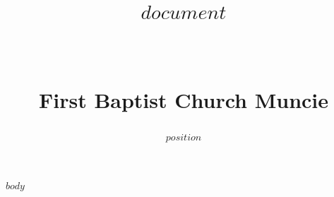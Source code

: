 \documentclass[paper=letter, fontsize=11pt]{scrartcl}	%
\title{ \vspace{-1in} 	\usefont{OT1}{bch}{b}{n}
		\huge \strut $document$ \strut \\
		\Large \bfseries \strut First Baptist Church Muncie \strut
}
\author{ 									\usefont{OT1}{bch}{m}{n}
        $position$ \\		\usefont{OT1}{bch}{m}{n}
}
\date{}
\numberwithin{equation}{section}															%
\numberwithin{figure}{section}																%
\numberwithin{table}{section}																%
\begin{document}
\maketitle

$body$
\end{document}
